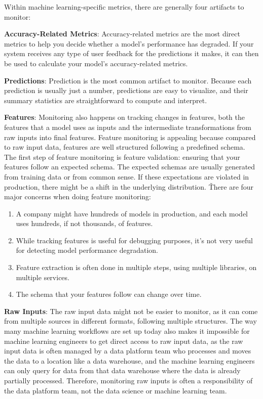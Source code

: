 Within machine learning-specific metrics, there are generally four artifacts to monitor:
\bit
\item \textbf{Accuracy-Related Metrics}: Accuracy-related metrics are the most direct metrics to help you decide
whether a model's performance has degraded. If your system receives any type of user feedback for the predictions it
makes, it can then be used to calculate your model's accuracy-related metrics.
\item \textbf{Predictions}: Prediction is the most common artifact to monitor. Because each prediction is usually
just a number, predictions are easy to visualize, and their summary statistics are straightforward to compute and
interpret.
\item \textbf{Features}: Monitoring also happens on tracking changes in features, both the features that a model uses
as inputs and the intermediate transformations from raw inputs into final features. Feature monitoring is appealing
because compared to raw input data, features are well structured following a predefined schema. The first step of
feature monitoring is feature validation: ensuring that your features follow an expected schema. The expected schemas
are usually generated from training data or from common sense. If these expectations are violated in production,
there might be a shift in the underlying distribution. \v

There are four major concerns when doing feature monitoring:
\begin{enumerate}
\item A company might have hundreds of models in production, and each model uses hundreds, if not thousands, of
features.
\item While tracking features is useful for debugging purposes, it's not very useful for detecting model performance
degradation.
\item Feature extraction is often done in multiple steps, using multiple libraries, on multiple services.
\item The schema that your features follow can change over time.
\end{enumerate}
\item \textbf{Raw Inputs}: The raw input data might not be easier to monitor, as it can come from multiple sources in
different formats, following multiple structures. The way many machine learning workflows are set up today also makes
it impossible for machine learning engineers to get direct access to raw input data, as the raw input data is often
managed by a data platform team who processes and moves the data to a location like a data warehouse, and the machine
learning engineers can only query for data from that data warehouse where the data is already partially processed.
Therefore, monitoring raw inputs is often a responsibility of the data platform team, not the data science or machine
learning team.
\eit

